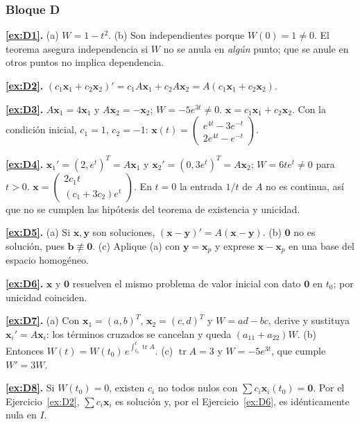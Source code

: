 \subsubsection*{Bloque D}
\noindent\textbf{\ref{ex:D1}.} (a) $W = 1 - t^2$. (b) Son independientes porque $W(0) = 1 \ne 0$. El teorema asegura independencia si $W$ no se anula en \emph{algún} punto; que se anule en otros puntos no implica dependencia.

\noindent\textbf{\ref{ex:D2}.} $(c_1\mathbf{x}_1 + c_2\mathbf{x}_2)' = c_1A\mathbf{x}_1 + c_2A\mathbf{x}_2 = A(c_1\mathbf{x}_1 + c_2\mathbf{x}_2)$.

\noindent\textbf{\ref{ex:D3}.} $A\mathbf{x}_1 = 4\mathbf{x}_1$ y $A\mathbf{x}_2 = -\mathbf{x}_2$; $W = -5e^{3t} \ne 0$. $\mathbf{x} = c_1\mathbf{x}_1 + c_2\mathbf{x}_2$. Con la condición inicial, $c_1 = 1$, $c_2 = -1$: $\mathbf{x}(t) = \begin{pmatrix} e^{4t} - 3e^{-t}\\ 2e^{4t} - e^{-t}\end{pmatrix}$.

\noindent\textbf{\ref{ex:D4}.} $\mathbf{x}_1' = (2, e^t)^T = A\mathbf{x}_1$ y $\mathbf{x}_2' = (0, 3e^t)^T = A\mathbf{x}_2$; $W = 6te^t \ne 0$ para $t > 0$. $\mathbf{x} = \begin{pmatrix}2c_1t\\ (c_1 + 3c_2)e^t\end{pmatrix}$. En $t = 0$ la entrada $1/t$ de $A$ no es continua, así que no se cumplen las hipótesis del teorema de existencia y unicidad.

\noindent\textbf{\ref{ex:D5}.} (a) Si $\mathbf{x}, \mathbf{y}$ son soluciones, $(\mathbf{x}-\mathbf{y})' = A(\mathbf{x}-\mathbf{y})$. (b) $\mathbf{0}$ no es solución, pues $\mathbf{b} \not\equiv \mathbf{0}$. (c) Aplique (a) con $\mathbf{y} = \mathbf{x}_p$ y exprese $\mathbf{x} - \mathbf{x}_p$ en una base del espacio homogéneo.

\noindent\textbf{\ref{ex:D6}.} $\mathbf{x}$ y $\mathbf{0}$ resuelven el mismo problema de valor inicial con dato $\mathbf{0}$ en $t_0$; por unicidad coinciden.

\noindent\textbf{\ref{ex:D7}.} (a) Con $\mathbf{x}_1 = (a,b)^T$, $\mathbf{x}_2 = (c,d)^T$ y $W = ad - bc$, derive y sustituya $\mathbf{x}_i' = A\mathbf{x}_i$: los términos cruzados se cancelan y queda $(a_{11} + a_{22})W$. (b) Entonces $W(t) = W(t_0)\,e^{\int_{t_0}^{t}\operatorname{tr}A}$. (c) $\operatorname{tr}A = 3$ y $W = -5e^{3t}$, que cumple $W' = 3W$.

\noindent\textbf{\ref{ex:D8}.} Si $W(t_0) = 0$, existen $c_i$ no todos nulos con $\sum c_i\mathbf{x}_i(t_0) = \mathbf{0}$. Por el Ejercicio~\ref{ex:D2}, $\sum c_i\mathbf{x}_i$ es solución y, por el Ejercicio~\ref{ex:D6}, es idénticamente nula en $I$.

